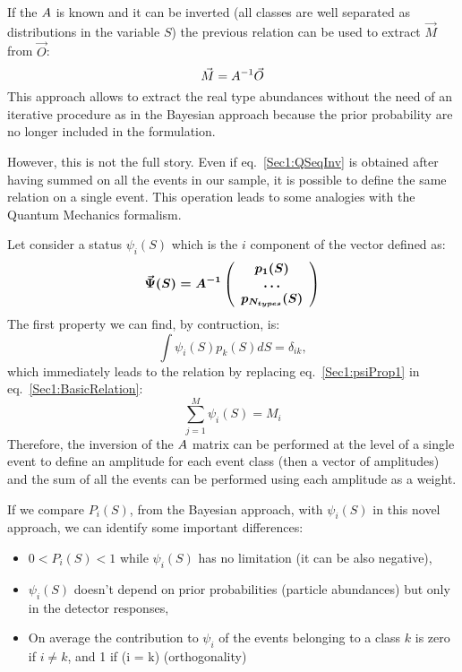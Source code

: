 If the $\boldmath{A}$ is known and it can be inverted (all classes are
well separated as distributions in the variable $S$) the previous relation can
be used to extract $\vec{M}$ from $\vec{O}$:
\begin{equation}
\label{Sec1:QSeqInv}
\vec{M} = \boldmath{A^{-1}} \vec{O}
\end{equation}
This approach allows to extract the real type abundances without the need of
an iterative procedure as in the Bayesian approach because the prior
probability are no longer included in the formulation.

However, this is not the full story. Even if eq.~\ref{Sec1:QSeqInv} is
obtained after having summed on all the events in our sample, it is possible
to define the same relation on a single event. This operation leads to some
analogies with the Quantum Mechanics formalism.

Let consider a status $\psi_{i}(S)$ which is the $i$ component of the vector
defined as:
\begin{equation}
\label{Sec1:psi}
\vec{\Psi}(S) = \boldmath{A^{-1}} 
\left(
\begin{array}{c}
p_{1}(S)\\
\ldots \\
p_{N_{types}}(S)
\end{array}
\right)
\end{equation}
The first property we can find, by contruction, is:
\begin{equation}
\label{Sec1:psiProp1}
\int \psi_{i}(S) p_{k}(S) dS = \delta_{ik},
\end{equation}
which immediately leads to the relation by replacing eq.~\ref{Sec1:psiProp1} in eq.~\ref{Sec1:BasicRelation}:
\begin{equation}
\label{Sec1:psi}
\sum\limits_{j=1}^{M}\psi_{i}(S) = M_{i}
\end{equation}
Therefore, the inversion of the $\boldmath{A}$ matrix can be performed at the
level of a single event to define an amplitude for each event class (then a
vector of amplitudes) and the sum of all the events can be performed using
each amplitude as a weight.

If we compare $P_{i}(S)$, from the Bayesian approach, with $\psi_{i}(S)$ in
this novel approach, we can identify some important differences:
\begin{itemize}
\item $0 < P_{i}(S) < 1$ while $\psi_{i}(S)$ has no limitation (it can be also
  negative),\\
\item $\psi_{i}(S)$ doesn't depend on prior probabilities (particle
  abundances) but only in the detector responses,\\
\item On average the contribution to
  $\psi_{i}$ of the events belonging to a class $k$ is zero if $i \neq k$, and
  1 if (i = k) (orthogonality)
\end{itemize}

